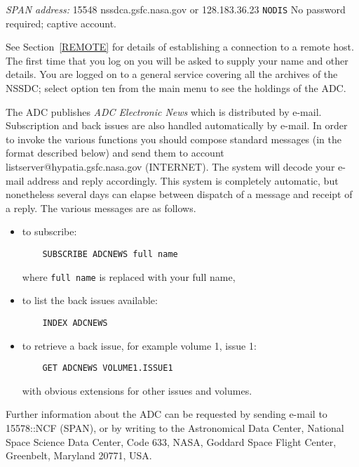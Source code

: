 \documentclass[twoside,11pt]{article}
\begin{document}
{\it SPAN address: } 15548
 nssdca.gsfc.nasa.gov or 128.183.36.23
 \verb-NODIS-
 No password required; captive account.

See Section~\ref{REMOTE} for details of establishing a connection to
a remote host. The first time that you log on you will
be asked to supply your name and other details. You are logged on to a
general service covering all the archives of the NSSDC; select option
ten from the main menu to see the holdings of the ADC.

The ADC publishes {\it ADC Electronic News} which is distributed by
e-mail. Subscription and back issues are also handled automatically by
e-mail. In order to invoke the various functions you should compose
standard messages (in the format described below) and send them to
account listserver@hypatia.gsfc.nasa.gov (INTERNET). The system will
decode your e-mail address and reply accordingly. This system is
completely automatic, but nonetheless several days can elapse between
dispatch of a message and receipt of a reply. The various messages are
as follows.

\begin{itemize}

  \item to subscribe:
  \begin{verbatim}
    SUBSCRIBE ADCNEWS full name
  \end{verbatim}

   where \verb-full name- is replaced with your full name,

  \item to list the back issues available:
  \begin{verbatim}
    INDEX ADCNEWS
  \end{verbatim}

  \item to retrieve a back issue, for example volume 1, issue 1:
  \begin{verbatim}
    GET ADCNEWS VOLUME1.ISSUE1
  \end{verbatim}

   with obvious extensions for other issues and volumes.

\end{itemize}

Further information about the ADC can be requested by sending e-mail
to 15578::NCF (SPAN), or by writing to the Astronomical Data Center,
National Space Science Data Center, Code 633, NASA, Goddard Space Flight
Center, Greenbelt, Maryland 20771, USA.
\end{document}
